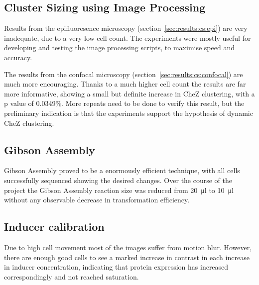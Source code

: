 \documentclass[../main.tex]{subfiles}
\begin{document}
\subsection{Cluster Sizing using Image Processing}

Results from the epifluoresence microscopy (section~\ref{sec:results:cs:epi}) are very inadequate, due to a very low cell count. The experiments were mostly useful for developing and testing the image processing scripts, to maximise speed and accuracy.

The results from the confocal microscopy (section~\ref{sec:results:cs:confocal}) are much more encouraging. Thanks to a much higher cell count the results are far more informative, showing a small but definite increase in CheZ clustering, with a p value of 0.0349\%. More repeats need to be done to verify this result, but the preliminary indication is that the experiments support the hypothesis of dynamic CheZ clustering.

\subsection{Gibson Assembly}
Gibson Assembly proved to be a enormously efficient technique, with all cells successfully sequenced showing the desired changes. Over the course of the project the Gibson Assembly reaction size was reduced from \SI{20}{\micro\litre} to \SI{10}{\micro\litre} without any observable decrease in transformation efficiency. 

\subsection{Inducer calibration}

Due to high cell movement most of the images suffer from motion blur. However, there are enough good cells to see a marked increase in contrast in each increase in inducer concentration, indicating that protein expression has increased correspondingly and not reached saturation.
\end{document}
